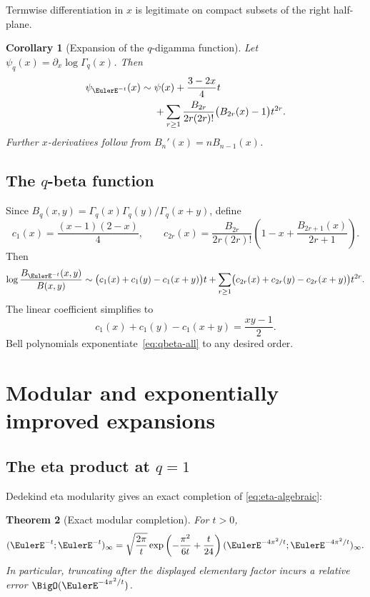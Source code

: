 \documentclass[11pt,oneside]{article}
\newtheorem{theorem}{Theorem}[section]
\newtheorem{corollary}[theorem]{Corollary}
\theoremstyle{definition}
\theoremstyle{remark}
\let\reporttopsection\section
\let\reportsubsection\subsection
\let\chapter\reporttopsection
\let\section\reportsubsection
\begin{document}
Termwise differentiation in $x$ is legitimate on compact subsets of the right
half-plane.

\begin{corollary}[Expansion of the $q$-digamma function]
Let $\psi_q(x)=\partial_x\log\Gamma_q(x)$.  Then
\begin{align}
 \psi_{\EulerE^{-t}}(x)
 \sim{}&\psi(x)+\frac{3-2x}{4}t
 \notag\\
 &+\sum_{r\ge1}\frac{B_{2r}}{2r(2r)!}
 \bigl(B_{2r}(x)-1\bigr)t^{2r}.                    \label{eq:qdigamma-all}
\end{align}
Further $x$-derivatives follow from
$B_n'(x)=nB_{n-1}(x)$.
\end{corollary}

\section{The \texorpdfstring{$q$}{q}-beta function}

Since
\(
B_q(x,y)=\Gamma_q(x)\Gamma_q(y)/\Gamma_q(x+y)
\), define
\[
 c_1(x)=\frac{(x-1)(2-x)}4,
 \qquad
 c_{2r}(x)=\frac{B_{2r}}{2r(2r)!}
 \left(1-x+\frac{B_{2r+1}(x)}{2r+1}\right).
\]
Then
\begin{equation}\label{eq:qbeta-all}
 \log\frac{B_{\EulerE^{-t}}(x,y)}{B(x,y)}
 \sim\bigl(c_1(x)+c_1(y)-c_1(x+y)\bigr)t
 +\sum_{r\ge1}
 \bigl(c_{2r}(x)+c_{2r}(y)-c_{2r}(x+y)\bigr)t^{2r}.
\end{equation}
The linear coefficient simplifies to
\begin{equation}\label{eq:qbeta-linear}
 c_1(x)+c_1(y)-c_1(x+y)=\frac{xy-1}{2}.
\end{equation}
Bell polynomials exponentiate~\eqref{eq:qbeta-all} to any desired order.

\chapter{Modular and exponentially improved expansions}\label{chap:modular}

\section{The eta product at \texorpdfstring{$q=1$}{q = 1}}

Dedekind eta modularity gives an exact completion of
\eqref{eq:eta-algebraic}:
\begin{theorem}[Exact modular completion]\label{thm:eta-exact}
For $t>0$,
\begin{equation}\label{eq:eta-exact}
 (\EulerE^{-t};\EulerE^{-t})_\infty
 =\sqrt{\frac{2\pi}{t}}
 \exp\left(-\frac{\pi^2}{6t}+\frac{t}{24}\right)
 (\EulerE^{-4\pi^2/t};\EulerE^{-4\pi^2/t})_\infty.
\end{equation}
In particular, truncating after the displayed elementary factor incurs a
relative error $\BigO(\EulerE^{-4\pi^2/t})$.
\end{theorem}
\end{document}
